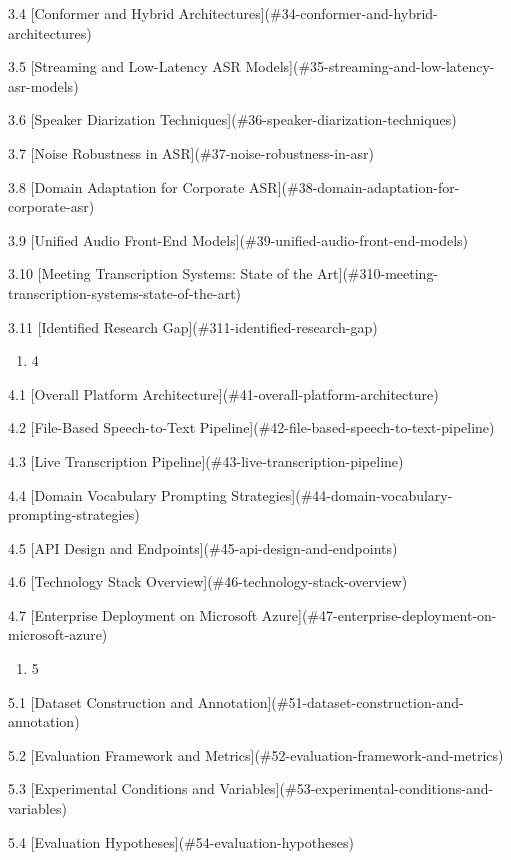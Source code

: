 \documentclass[12pt,a4paper]{article}
\begin{document}
3.4 [Conformer and Hybrid Architectures](\#34-conformer-and-hybrid-architectures)

3.5 [Streaming and Low-Latency ASR Models](\#35-streaming-and-low-latency-asr-models)

3.6 [Speaker Diarization Techniques](\#36-speaker-diarization-techniques)

3.7 [Noise Robustness in ASR](\#37-noise-robustness-in-asr)

3.8 [Domain Adaptation for Corporate ASR](\#38-domain-adaptation-for-corporate-asr)

3.9 [Unified Audio Front-End Models](\#39-unified-audio-front-end-models)

3.10 [Meeting Transcription Systems: State of the Art](\#310-meeting-transcription-systems-state-of-the-art)

3.11 [Identified Research Gap](\#311-identified-research-gap)

\begin{enumerate}
  \item 4
\end{enumerate}

4.1 [Overall Platform Architecture](\#41-overall-platform-architecture)

4.2 [File-Based Speech-to-Text Pipeline](\#42-file-based-speech-to-text-pipeline)

4.3 [Live Transcription Pipeline](\#43-live-transcription-pipeline)

4.4 [Domain Vocabulary Prompting Strategies](\#44-domain-vocabulary-prompting-strategies)

4.5 [API Design and Endpoints](\#45-api-design-and-endpoints)

4.6 [Technology Stack Overview](\#46-technology-stack-overview)

4.7 [Enterprise Deployment on Microsoft Azure](\#47-enterprise-deployment-on-microsoft-azure)

\begin{enumerate}
  \item 5
\end{enumerate}

5.1 [Dataset Construction and Annotation](\#51-dataset-construction-and-annotation)

5.2 [Evaluation Framework and Metrics](\#52-evaluation-framework-and-metrics)

5.3 [Experimental Conditions and Variables](\#53-experimental-conditions-and-variables)

5.4 [Evaluation Hypotheses](\#54-evaluation-hypotheses)
\end{document}
